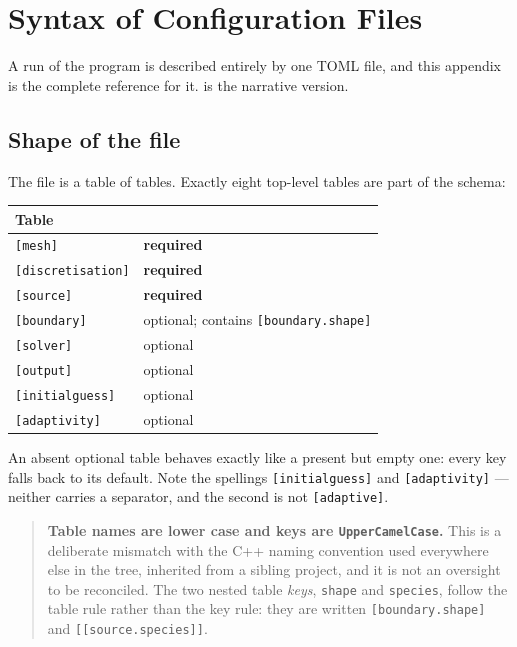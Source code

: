 \chapter{Syntax of {\meq} Configuration Files}
\label{ap:config}

A run of the {\meq} program is described entirely by one TOML file, and this
appendix is the complete reference for it.  is the narrative
version.

\section{Shape of the file}

The file is a table of tables. Exactly eight top-level tables are part of the
schema:

\begin{center}
\begin{tabular}{l l}
	\hline
	Table & \\
	\hline
	\texttt{[mesh]} & \textbf{required} \\
	\texttt{[discretisation]} & \textbf{required} \\
	\texttt{[source]} & \textbf{required} \\
	\texttt{[boundary]} & optional; contains \texttt{[boundary.shape]} \\
	\texttt{[solver]} & optional \\
	\texttt{[output]} & optional \\
	\texttt{[initialguess]} & optional \\
	\texttt{[adaptivity]} & optional \\
	\hline
\end{tabular}
\end{center}

An absent optional table behaves exactly like a present but empty one: every key
falls back to its default. Note the spellings \texttt{[initialguess]} and
\texttt{[adaptivity]} --- neither carries a separator, and the second is not
\texttt{[adaptive]}.

\begin{quote}
	\textbf{Table names are lower case and keys are \texttt{UpperCamelCase}.}
	This is a deliberate mismatch with the C++ naming convention used
	everywhere else in the tree, inherited from a sibling project, and it is
	not an oversight to be reconciled. The two nested table \emph{keys},
	\texttt{shape} and \texttt{species}, follow the table rule rather than the
	key rule: they are written \texttt{[boundary.shape]} and
	\texttt{[[source.species]]}.
\end{quote}

